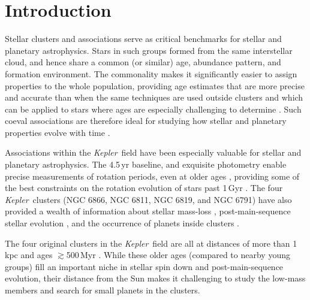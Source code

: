 \documentclass[twocolumn, linenumbers]{aastex631}
\newcommand{\kepler}{{\it Kepler}}
\begin{document}

\section{Introduction}\label{sec:intro}
Stellar clusters and associations serve as critical benchmarks for stellar and planetary astrophysics. Stars in such groups formed from the same interstellar cloud, and hence share a common (or similar) age, abundance pattern, and formation environment. The commonality makes it significantly easier to assign properties to the whole population, providing age estimates that are more precise and accurate than when the same techniques are used outside clusters \citep[e.g., Gyrochronology;][]{2007ApJ...669.1167B, vanSaders2016} and which can be applied to stars where ages are especially challenging to determine \citep[e.g., M dwarfs;][]{2021arXiv210401232K}. Such coeval associations are therefore ideal for studying how stellar and planetary properties evolve with time \citep[e.g.,][]{2019ARA&A..57..227K, 2019ApJS..245...13B,  THYMEIV}. 

Associations within the \kepler\ field have been especially valuable for stellar and planetary astrophysics. The 4.5\,yr baseline, and exquisite photometry enable precise measurements of rotation periods, even at older ages \citep[e.g.,][]{Angus2015, Aigrain2015}, providing some of the best constraints on the rotation evolution of stars past 1\,Gyr \citep{2011ApJ...733L...9M, Curtis_stall}. The four \kepler\ clusters (NGC 6866, NGC 6811, NGC 6819, and NGC 6791) have also provided a wealth of information about stellar mass-loss \citep{2012MNRAS.419.2077M}, post-main-sequence stellar evolution \citep{2012ApJ...757..190C}, and the occurrence of planets inside clusters \citep{Meibom2013}.  

The four original clusters in the \kepler\ field are all at distances of more than 1\,kpc and ages $\gtrsim$500\,Myr \citep{Batalha:2010fk}. While these older ages (compared to nearby young groups) fill an important niche in stellar spin down and post-main-sequence evolution, their distance from the Sun makes it challenging to study the low-mass members and search for small planets in the clusters. 
\end{document}
